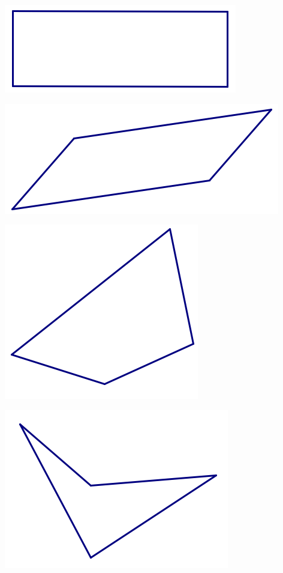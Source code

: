 \documentclass[12pt, reqno]{amsart}
\theoremstyle{remark}
\theoremstyle{definition}
\numberwithin{equation}{section}  %
\begin{document}
\begin{center}
\includegraphics[scale=0.85]{rect2}

\includegraphics[scale=0.75]{quad3}


\includegraphics[scale=0.75]{quad1}

\includegraphics[scale=0.75]{quad2}




\end{center}
\end{document}
